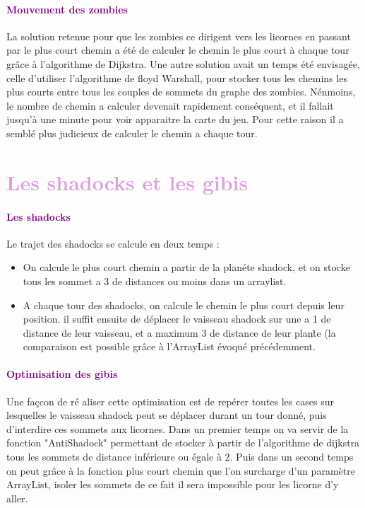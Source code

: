 \documentclass{report}
\begin{document}
			\paragraph{\textcolor{purple}{Mouvement des zombies}}
			La solution retenue pour que les zombies ce dirigent vers les licornes en passant par le plus court chemin a \'et\'e de calculer le chemin le plus court \`a chaque tour gr\^ace \`a l'algorithme de Dijkstra. Une autre solution avait un temps \'et\'e envisag\'ee, celle d'utiliser l'algorithme de floyd Warshall, pour stocker tous les chemins les plus courts entre tous les couples de sommets du graphe des zombies. N\'enmoins, le nombre de chemin a calculer devenait rapidement cons\'equent, et il fallait jusqu'\`a une minute pour voir apparaitre la carte du jeu. Pour cette raison il a sembl\'e plus judicieux de calculer le chemin a chaque tour.
			
	\section*{\textcolor{Plum}{Les shadocks et les gibis}}			
			\paragraph{\textcolor{purple}{Les shadocks}}
			Le trajet des shadocks se calcule en deux temps :
				
			\begin{itemize}
				\item On calcule le plus court chemin a partir de la plan\'ete shadock, et on stocke tous les sommet a 3 de distances ou moins dans un arraylist.
				\item A chaque tour des shadocks, on calcule le chemin le plus court depuis leur position. il suffit ensuite de d\'eplacer le vaisseau shadock sur une a 1 de distance de leur vaisseau, et a maximum 3 de distance de leur plan\`te (la comparaison est possible gr\^ace \`a l'ArrayList \'evoqu\'e pr\'ec\'edemment.
			\end{itemize}

			\paragraph{\textcolor{purple}{Optimisation des gibis}}
			Une façcon de ré aliser cette optimisation est de rep\'erer toutes les cases sur lesquelles le vaisseau shadock peut se d\'eplacer durant un tour donn\'e, puis d'interdire ces sommets aux licornes.
			Dans un premier temps on va servir de la fonction "AntiShadock" permettant de stocker à partir de l'algorithme de dijkstra tous les sommets de distance inf\'erieure ou \'egale \`a 2.
			Puis dans un second temps on peut grâce à la fonction plus court chemin que l'on surcharge d'un paramètre ArrayList, isoler les sommets de ce fait il sera impossible pour les licorne d'y aller.
\end{document}
